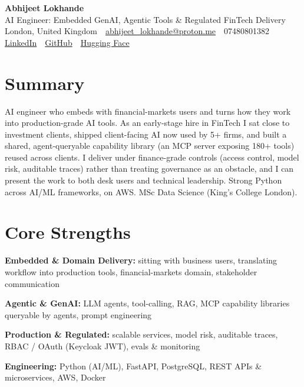 \documentclass[10pt,a4paper]{article}
\newcommand{\sep}{\,\textcolor{accent!60}{\textbar}\,}
\begin{document}
\begin{center}
  {\fontsize{24}{26}\selectfont\bfseries Abhijeet Lokhande}\\[3pt]
  {\color{accent}\large AI Engineer: Embedded GenAI, Agentic Tools \& Regulated FinTech Delivery}\\[5pt]
  {\small
    London, United Kingdom \sep
    \href{mailto:abhijeet_lokhande@proton.me}{abhijeet\_lokhande@proton.me} \sep
    07480801382 \\[2pt]
    \href{https://www.linkedin.com/in/ablds/}{LinkedIn} \sep
    \href{https://github.com/abhijeetscode}{GitHub} \sep
    \href{https://huggingface.co/ab-ai}{Hugging Face}
  }
\end{center}
\vspace{2pt}

\section{Summary}
AI engineer who embeds with financial-markets users and turns how they work into production-grade AI tools. As an early-stage hire in FinTech I sat close to investment clients, shipped client-facing AI now used by 5+ firms, and built a shared, agent-queryable capability library (an MCP server exposing 180+ tools) reused across clients. I deliver under finance-grade controls (access control, model risk, auditable traces) rather than treating governance as an obstacle, and I can present the work to both desk users and technical leadership. Strong Python across AI/ML frameworks, on AWS. MSc Data Science (King's College London).

\section{Core Strengths}
\begin{tight}
  \item[\textcolor{accent}{\small$\bullet$}] \textbf{Embedded \& Domain Delivery:} sitting with business users, translating workflow into production tools, financial-markets domain, stakeholder communication
  \item[\textcolor{accent}{\small$\bullet$}] \textbf{Agentic \& GenAI:} LLM agents, tool-calling, RAG, MCP capability libraries queryable by agents, prompt engineering
  \item[\textcolor{accent}{\small$\bullet$}] \textbf{Production \& Regulated:} scalable services, model risk, auditable traces, RBAC / OAuth (Keycloak JWT), evals \& monitoring
  \item[\textcolor{accent}{\small$\bullet$}] \textbf{Engineering:} Python (AI/ML), FastAPI, PostgreSQL, REST APIs \& microservices, AWS, Docker
\end{tight}
\end{document}
